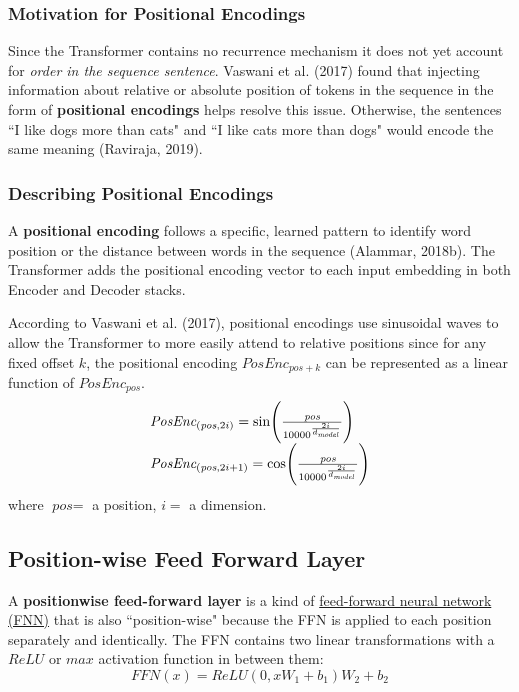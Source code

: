 \subsubsection{Motivation for Positional Encodings}

Since the Transformer contains no recurrence mechanism it does not yet account for \emph{order in the sequence sentence}. Vaswani et al. (2017) found that injecting information about relative or absolute position of tokens in the sequence in the form of \textbf{positional encodings} helps resolve this issue. 
Otherwise, the sentences ``I like dogs more than cats" and ``I like cats more than dogs" would encode the same meaning (Raviraja, 2019). 

\subsubsection{Describing Positional Encodings}

A \textbf{positional encoding} follows a specific, learned pattern to identify word position or the distance between words in the sequence (Alammar, 2018b). The Transformer adds the positional encoding vector to each input embedding in both Encoder and Decoder stacks.   

According to Vaswani et al. (2017), positional encodings use sinusoidal waves to allow the Transformer to more easily attend to relative positions since for any fixed offset $k$, the positional encoding $\textit{PosEnc}_{\textit{pos} + k}$ can be represented as a linear function of $\textit{PosEnc}_{\textit{pos}}$.
$$
\begin{array}{ll}
\textit{PosEnc}_{\Large (\textit{pos}, 2i)} = \text{sin} \Bigg(\frac {\textit{pos}} {10000^{\Large \frac {2i} {d_{\textit{model}}} } }  \Bigg) \\
\textit{PosEnc}_{\Large (\textit{pos}, 2i + 1)} = \text{cos} \Bigg(\frac {\textit{pos}} {10000^{\Large \frac {2i} {d_{\textit{model}}} } }  \Bigg)
\end{array}
$$
where $\textit{pos} = $ a position, $i = $ a dimension.


\subsection{Position-wise Feed Forward Layer} \label{sec:PositionwiseFFNLayers}

A \textbf{positionwise feed-forward layer} is a kind of \hyperref[sec:NeuralNetRepr]{feed-forward neural network (FNN)} that is also ``position-wise" because the FFN is applied to each position separately and identically. The FFN contains two linear transformations with a $\textit{ReLU}$ or $\textit{max}$ activation function in between them:
$$
\textit{FFN}(x) = \textit{ReLU}(0, x W_1 + b_1) W_2 + b_2
$$

